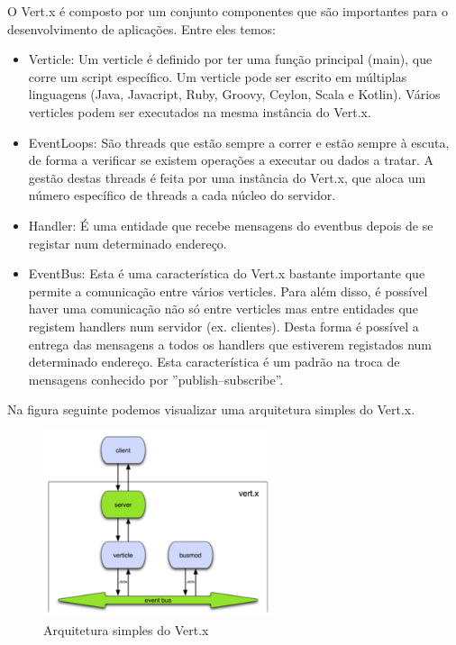 O Vert.x é composto por um conjunto componentes que são importantes para o desenvolvimento de aplicações. Entre eles temos: 

\begin{itemize}
  \item Verticle: Um verticle é definido por ter uma função principal (main), que corre um script específico. Um verticle pode ser escrito em múltiplas linguagens (Java, Javacript, Ruby, Groovy, Ceylon, Scala e Kotlin). Vários verticles podem ser executados na mesma instância do Vert.x.
  \item EventLoops: São threads que estão sempre a correr e estão sempre à escuta, de forma a verificar se existem operações a executar ou dados a tratar. A gestão destas threads é feita por uma instância do Vert.x, que aloca um número específico de threads a cada núcleo do servidor.
  \item Handler: É uma entidade que recebe mensagens do eventbus depois de se registar num determinado endereço.
  \item EventBus: Esta é uma característica do Vert.x bastante importante que permite a comunicação entre vários verticles. Para além disso, é possível haver uma comunicação não só entre verticles mas entre entidades que registem handlers num servidor (ex. clientes). Desta forma é possível a entrega das mensagens a todos os handlers que estiverem registados num determinado endereço. Esta característica é um padrão na troca de mensagens conhecido por ''publish–subscribe''.
\end{itemize}

Na figura seguinte podemos visualizar uma arquitetura simples do Vert.x. \cite{vertx-study}

\begin{figure}[H]
  \centering
  \includegraphics[width=0.6\textwidth]{imgs/vertx_arch.png}
  \caption[Arquitetura simples do Vert.x]{Arquitetura simples do Vert.x}
  \label{f:vertxarch}
\end{figure}


